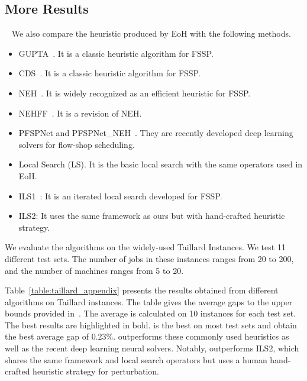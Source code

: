 \subsection{More Results}~\label{more_results_fssp}
We also compare the heuristic produced by EoH with the following methods. 
\begin{itemize}
\item GUPTA~\cite{gupta1971functional}. It is a classic heuristic algorithm for FSSP.
\item CDS~\cite{campbell1970heuristic}. It is a classic heuristic algorithm for FSSP.
\item  NEH~\cite{nawaz1983heuristic}. It is widely recognized as an efficient heuristic for FSSP.
\item NEHFF~\cite{fernandez2014insertion}. It is a revision of NEH.
\item PFSPNet and PFSPNet\_NEH~\cite{pan2021deep}. They are recently developed deep learning solvers for flow-shop scheduling.
\item Local Search (LS). It is the basic local search with the same operators used in EoH. 
\item ILS1~\cite{stutzle1998applying}: It is an iterated local search developed for FSSP.
\item ILS2: It uses the same framework as ours but with hand-crafted heuristic strategy.
\end{itemize}



We evaluate the algorithms on the widely-used Taillard Instances. We test 11 different test sets.  The number of jobs in these instances ranges from 20 to 200, and the number of machines ranges from 5 to 20.


Table~\ref{table:taillard_appendix} presents the results obtained from different algorithms on Taillard instances. The table gives the average gaps to the upper bounds provided in~\citet{taillard1993benchmarks}. The average is calculated on 10 instances for each test set. The best results are highlighted in bold. \ourmethod{} is the best on most test sets and obtain the best average gap of 0.23\%. \ourmethod{} outperforms these commonly used heuristics as well as the recent deep learning neural solvers. Notably, \ourmethod{} outperforms ILS2, which shares the same framework and local search operators but uses a human hand-crafted heuristic strategy for perturbation.


